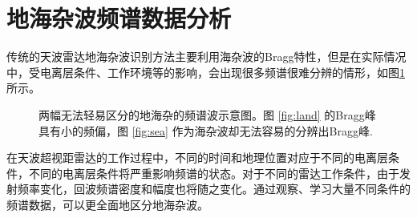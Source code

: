 \section{地海杂波频谱数据分析}
\label{sec:othr_data}
传统的天波雷达地海杂波识别方法主要利用海杂波的Bragg特性，但是在实际情况中，受电离层条件、工作环境等的影响，会出现很多频谱很难分辨的情形，如图\ref{fig:spectrum}所示。
\begin{figure}[H]
	\centering
	\hfil
	\caption{两幅无法轻易区分的地海杂的频谱波示意图。图 \ref{fig:land} 的Bragg峰具有小的频偏，图 \ref{fig:sea} 作为海杂波却无法容易的分辨出Bragg峰.}
	\label{fig:spectrum}
\end{figure}
在天波超视距雷达的工作过程中，不同的时间和地理位置对应于不同的电离层条件，不同的电离层条件将严重影响频谱的状态。对于不同的雷达工作条件，由于发射频率变化，回波频谱密度和幅度也将随之变化。通过观察、学习大量不同条件的频谱数据，可以更全面地区分地海杂波。


